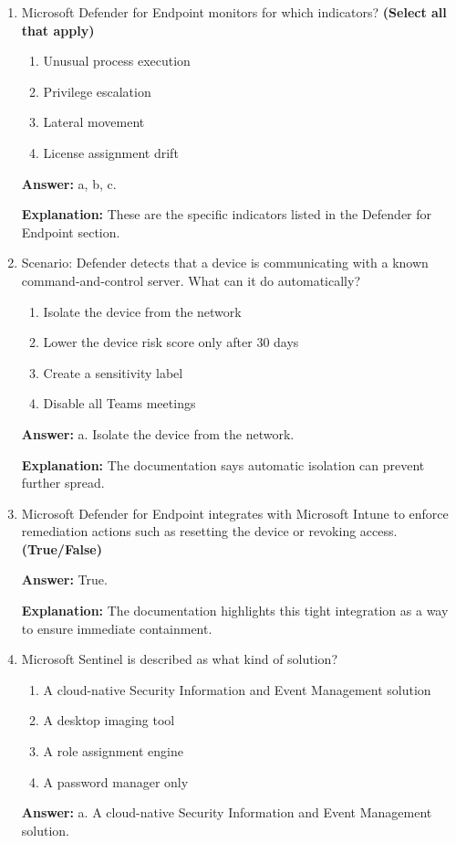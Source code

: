 \documentclass[10pt]{article}
\begin{document}
\begin{enumerate}[leftmargin=*]
\textbf{Explanation:} These three integrated tools are named in Phase 5.

\item Microsoft Defender for Endpoint monitors for which indicators? \textbf{(Select all that apply)}
\begin{enumerate}[label=\alph*., leftmargin=1.5em]
\item Unusual process execution
\item Privilege escalation
\item Lateral movement
\item License assignment drift
\end{enumerate}
\textbf{Answer:} a, b, c.

\textbf{Explanation:} These are the specific indicators listed in the Defender for Endpoint section.

\item Scenario: Defender detects that a device is communicating with a known command-and-control server. What can it do automatically?
\begin{enumerate}[label=\alph*., leftmargin=1.5em]
\item Isolate the device from the network
\item Lower the device risk score only after 30 days
\item Create a sensitivity label
\item Disable all Teams meetings
\end{enumerate}
\textbf{Answer:} a. Isolate the device from the network.

\textbf{Explanation:} The documentation says automatic isolation can prevent further spread.

\item Microsoft Defender for Endpoint integrates with Microsoft Intune to enforce remediation actions such as resetting the device or revoking access. \textbf{(True/False)}

\textbf{Answer:} True.

\textbf{Explanation:} The documentation highlights this tight integration as a way to ensure immediate containment.

\item Microsoft Sentinel is described as what kind of solution?
\begin{enumerate}[label=\alph*., leftmargin=1.5em]
\item A cloud-native Security Information and Event Management solution
\item A desktop imaging tool
\item A role assignment engine
\item A password manager only
\end{enumerate}
\textbf{Answer:} a. A cloud-native Security Information and Event Management solution.


\end{enumerate}
\end{document}
